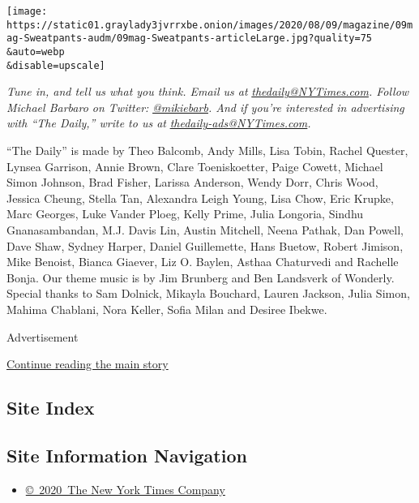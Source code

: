 \texttt{[image: https://static01.graylady3jvrrxbe.onion/images/2020/08/09/magazine/09mag-Sweatpants-audm/09mag-Sweatpants-articleLarge.jpg?quality=75\\\&auto=webp\\\&disable=upscale]}

\emph{Tune in, and tell us what you think. Email us at}
\href{mailto:thedaily@NYTimes.com}{\emph{thedaily@NYTimes.com}}\emph{.
Follow Michael Barbaro on Twitter:}
\href{https://twitter.com/mikiebarb}{\emph{@mikiebarb}}\emph{. And if
you're interested in advertising with ``The Daily,'' write to us at}
\href{mailto:thedaily-ads@NYTimes.com}{\emph{thedaily-ads@NYTimes.com}}\emph{.}

``The Daily'' is made by Theo Balcomb, Andy Mills, Lisa Tobin, Rachel
Quester, Lynsea Garrison, Annie Brown, Clare Toeniskoetter, Paige
Cowett, Michael Simon Johnson, Brad Fisher, Larissa Anderson, Wendy
Dorr, Chris Wood, Jessica Cheung, Stella Tan, Alexandra Leigh Young,
Lisa Chow, Eric Krupke, Marc Georges, Luke Vander Ploeg, Kelly Prime,
Julia Longoria, Sindhu Gnanasambandan, M.J. Davis Lin, Austin Mitchell,
Neena Pathak, Dan Powell, Dave Shaw, Sydney Harper, Daniel Guillemette,
Hans Buetow, Robert Jimison, Mike Benoist, Bianca Giaever, Liz O.
Baylen, Asthaa Chaturvedi and Rachelle Bonja. Our theme music is by Jim
Brunberg and Ben Landsverk of Wonderly. Special thanks to Sam Dolnick,
Mikayla Bouchard, Lauren Jackson, Julia Simon, Mahima Chablani, Nora
Keller, Sofia Milan and Desiree Ibekwe.

Advertisement

\protect\hyperlink{after-bottom}{Continue reading the main story}

\hypertarget{site-index}{%
\subsection{Site Index}\label{site-index}}

\hypertarget{site-information-navigation}{%
\subsection{Site Information
Navigation}\label{site-information-navigation}}

\begin{itemize}
\tightlist
\item
  \href{https://help.nytimes3xbfgragh.onion/hc/en-us/articles/115014792127-Copyright-notice}{©~2020~The
  New York Times Company}
\end{itemize}

